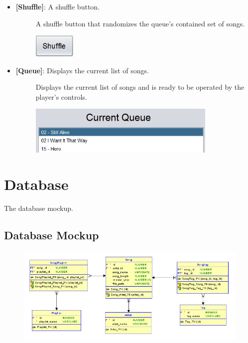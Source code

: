 \documentclass{article}
\begin{document}
\begin{itemize}
    \item \textbf{[Shuffle]}: A shuffle button.
    \begin{description}
        \item[] A shuffle button that randomizes the queue's contained set of songs.
        \item[] \includegraphics[width=2cm]{Images/Shuffle.png}
    \end{description}
    \item \textbf{[Queue]}: Displays the current list of songs.
        \begin{description}
        \item[] Displays the current list of songs and is ready to be operated by the player's controls.
        \item[] \includegraphics[width=9cm]{Images/CurrentQueue.png}
        \end{description}
\end{itemize}

\vspace{0.5cm}

\section{Database}
\quad The database mockup.

\subsection{Database Mockup}

\begin{figure}[h]
\includegraphics[width=18cm]{Images/AMP_DB_Mockup.PNG}
\end{figure}
\end{document}
